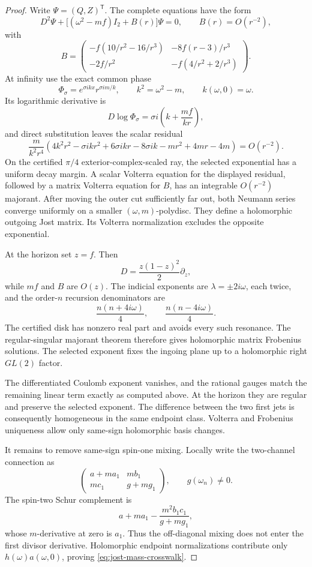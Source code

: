 \documentclass[11pt]{article}
\theoremstyle{remark}
\begin{document}
\begin{proof}
Write \(\Psi=(Q,Z)^{\mathsf T}\).  The complete equations have the form
\[
 D^2\Psi+\bigl[(\omega^2-mf)I_2+B(r)\bigr]\Psi=0,
 \qquad B(r)=O(r^{-2}),
\]
with
\[
 B=
 \begin{pmatrix}
 -f(10/r^2-16/r^3)&-8f(r-3)/r^3\\
 -2f/r^2&-f(4/r^2+2/r^3)
 \end{pmatrix}.
\]
At infinity use the exact common phase
\[
 \Phi_\sigma=e^{\sigma ikx}r^{\sigma im/k},
 \qquad k^2=\omega^2-m,\qquad k(\omega,0)=\omega.
\]
Its logarithmic derivative is
\[
 D\log\Phi_\sigma
 =\sigma i\left(k+\frac{mf}{kr}\right),
\]
and direct substitution leaves the scalar residual
\[
 \frac{m}{k^2r^4}
 \left(
 4k^2r^2-\sigma ikr^2+6\sigma ikr-8\sigma ik
 {}-mr^2+4mr-4m
 \right)=O(r^{-2}).
\]
On the certified \(\pi/4\) exterior-complex-scaled ray, the selected
exponential has a uniform decay margin.  A scalar Volterra equation for
the displayed residual, followed by a matrix Volterra equation for
\(B\), has an integrable \(O(r^{-2})\) majorant.  After moving the outer
cut sufficiently far out, both Neumann series converge uniformly on a
smaller \((\omega,m)\)-polydisc.  They define a holomorphic outgoing
Jost matrix.  Its Volterra normalization excludes the opposite
exponential.

At the horizon set \(z=f\).  Then
\[
 D=\frac{z(1-z)^2}{2}\partial_z,
\]
while \(mf\) and \(B\) are \(O(z)\).  The indicial exponents are
\(\lambda=\pm2i\omega\), each twice, and the order-\(n\) recursion
denominators are
\[
 \frac{n(n+4i\omega)}4,\qquad
 \frac{n(n-4i\omega)}4.
\]
The certified disk has nonzero real part and avoids every such resonance.
The regular-singular majorant theorem therefore gives holomorphic matrix
Frobenius solutions.  The selected exponent fixes the ingoing plane up to
a holomorphic right \(GL(2)\) factor.

The differentiated Coulomb exponent vanishes, and the rational gauges
match the remaining linear term exactly as computed above.  At the
horizon they are regular and preserve the selected exponent.  The
difference between the two first jets is consequently homogeneous in the
same endpoint class.  Volterra and Frobenius uniqueness allow only
same-sign holomorphic basis changes.

It remains to remove same-sign spin-one mixing.  Locally write the
two-channel connection as
\[
 \begin{pmatrix}
 a+ma_1&mb_1\\ mc_1&g+mg_1
 \end{pmatrix},
 \qquad g(\omega_n)\ne0.
\]
The spin-two Schur complement is
\[
 a+ma_1-\frac{m^2b_1c_1}{g+mg_1},
\]
whose \(m\)-derivative at zero is \(a_1\).  Thus the off-diagonal mixing
does not enter the first divisor derivative.  Holomorphic endpoint
normalizations contribute only \(h(\omega)a(\omega,0)\), proving
\eqref{eq:jost-mass-crosswalk}.
\end{proof}
\end{document}
